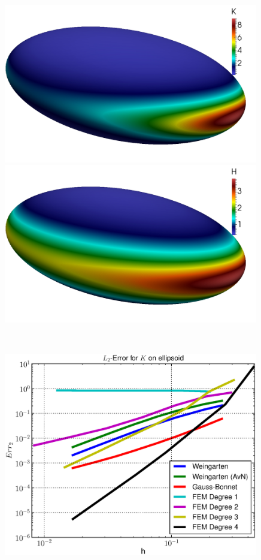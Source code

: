   \begin{figure}
    \begin{minipage}[htp]{.23\textwidth}
      \centering
      \includegraphics[width=0.99\textwidth]{bilder/ellipsoid/K.jpg}
    \end{minipage}\hfill
    \begin{minipage}[htp]{.23\textwidth}
      \centering
      \includegraphics[width=0.99\textwidth]{bilder/ellipsoid/H.jpg}
    \end{minipage}\\
    \begin{minipage}[htp]{.23\textwidth}
      \centering
      \includegraphics[width=0.99\textwidth]{bilder/ellipsoid/L2K.eps}

\end{minipage}
\end{figure}
